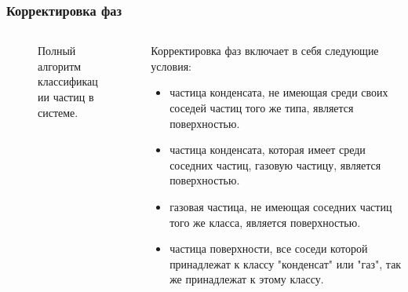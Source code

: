 \documentclass[pdf,hyperref={unicode}]{beamer}
\begin{document}
\begin{frame}
\transdissolve[duration=0.2]
\frametitle{Корректировка фаз}
\begin{columns}

\begin{column}{0.47\linewidth}
{
\begin{figure}[h]
\caption{\tiny Полный алгоритм классификации частиц в системе.}
\end{figure}
}
\end{column}

\begin{column}{0.47\linewidth}
{\tiny{
Корректировка фаз включает в себя следующие условия:
\begin{itemize}
\item частица конденсата, не имеющая среди своих соседей частиц того же типа, является поверхностью.
\item частица конденсата, которая имеет среди соседних частиц, газовую частицу, является поверхностью.
\item газовая частица, не имеющая соседних частиц того же класса,  является поверхностью.
\item частица поверхности, все соседи которой принадлежат к классу "конденсат" или "газ", так же принадлежат к этому классу.
\end{itemize}
}}
\end{column}

\end{columns}
\end{frame}
\end{document}
